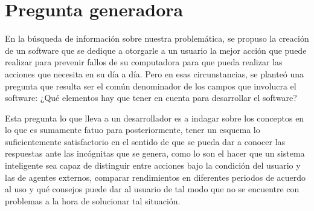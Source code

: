 \pagebreak
\section{Pregunta generadora}

En la búsqueda de información sobre nuestra problemática, se propuso la creación
de un software que se dedique a otorgarle a un usuario la mejor acción que puede
realizar para prevenir fallos de su computadora para que pueda realizar las
acciones que necesita en su día a día. Pero en esas circunstancias, se planteó
una pregunta que resulta ser el común denominador de los campos que involucra el
software: ¿Qué elementos hay que tener en cuenta para desarrollar el software?

Esta pregunta lo que lleva a un desarrollador es a indagar sobre los conceptos
en lo que es sumamente fatuo para posteriormente, tener un esquema lo
suficientemente satisfactorio en el sentido de que se pueda dar a conocer las
respuestas ante las incógnitas que se genera, como lo son el hacer que un
sistema inteligente sea capaz de distinguir entre acciones bajo la condición del
usuario y las de agentes externos, comparar rendimientos en diferentes periodos
de acuerdo al uso y qué consejos puede dar al usuario de tal modo que no se
encuentre con problemas a la hora de solucionar tal situación.
